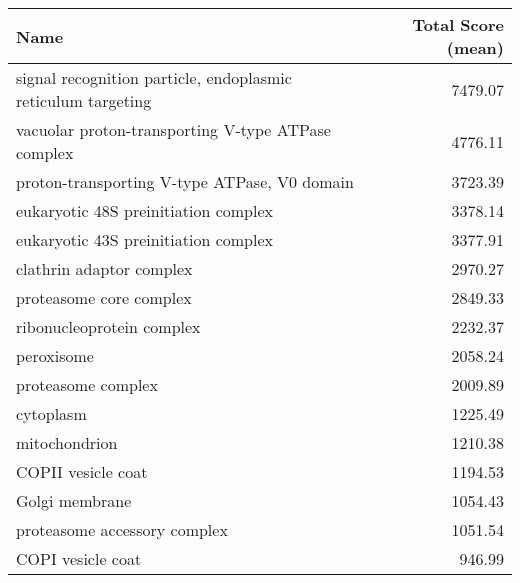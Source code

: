 \begin{table}[h]
\begin{center} \sf
\begin{tabular}{@{}lr@{}}
\toprule
\textbf{Name}                                                & \textbf{Total Score (mean)} \\ \midrule
signal recognition particle, endoplasmic reticulum targeting & 7479.07                     \\
vacuolar proton-transporting V-type ATPase complex           & 4776.11                     \\
proton-transporting V-type ATPase, V0 domain                 & 3723.39                     \\
eukaryotic 48S preinitiation complex                         & 3378.14                     \\ %
eukaryotic 43S preinitiation complex                         & 3377.91                     \\ %
clathrin adaptor complex                                     & 2970.27                     \\ %
proteasome core complex                                      & 2849.33                     \\ %
ribonucleoprotein complex                                    & 2232.37                     \\
peroxisome                                                   & 2058.24                     \\
proteasome complex                                           & 2009.89                     \\
cytoplasm                                                    & 1225.49                     \\
mitochondrion                                                & 1210.38                     \\
COPII vesicle coat                                           & 1194.53                     \\
Golgi membrane                                               & 1054.43                     \\
proteasome accessory complex                                 & 1051.54                     \\
COPI vesicle coat                                            & 946.99                      \\

\end{tabular}
\end{center}
\end{table}
